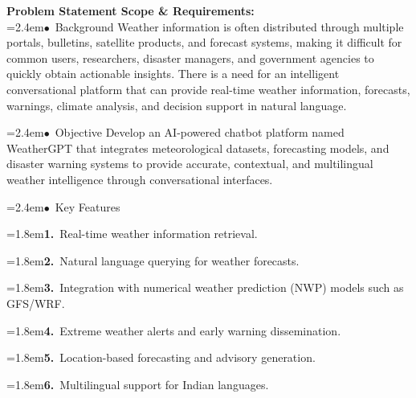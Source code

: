 \documentclass[10pt,a4paper]{article}
\begin{document}
\begin{tcolorbox}[pscard, title={"\textbf{SIH26068} \quad $\vert$ \quad WeatherGPT: Conversational AI for Weather Forecasting, Alerts, and Climate ...}]
\textbf{\color{sihnavy}Problem Statement Scope \& Requirements:}\\[0.15cm]
\noindent\hspace*{1.2em}\hangindent=2.4em\textcolor{sihblue}{$\bullet$}~\small Background Weather information is often distributed through multiple portals, bulletins, satellite products, and forecast systems, making it difficult for common users, researchers, disaster managers, and government agencies to quickly obtain actionable insights. There is a need for an intelligent conversational platform that can provide real-time weather information, forecasts, warnings, climate analysis, and decision support in natural language.\par\vspace{0.05cm}
\noindent\hspace*{1.2em}\hangindent=2.4em\textcolor{sihblue}{$\bullet$}~\small Objective Develop an AI-powered chatbot platform named WeatherGPT that integrates meteorological datasets, forecasting models, and disaster warning systems to provide accurate, contextual, and multilingual weather intelligence through conversational interfaces.\par\vspace{0.05cm}
\noindent\hspace*{1.2em}\hangindent=2.4em\textcolor{sihblue}{$\bullet$}~\small Key Features\par\vspace{0.05cm}
\noindent\hangindent=1.8em\textbf{1.}~\small Real-time weather information retrieval.\par\vspace{0.06cm}
\noindent\hangindent=1.8em\textbf{2.}~\small Natural language querying for weather forecasts.\par\vspace{0.06cm}
\noindent\hangindent=1.8em\textbf{3.}~\small Integration with numerical weather prediction (NWP) models such as GFS/WRF.\par\vspace{0.06cm}
\noindent\hangindent=1.8em\textbf{4.}~\small Extreme weather alerts and early warning dissemination.\par\vspace{0.06cm}
\noindent\hangindent=1.8em\textbf{5.}~\small Location-based forecasting and advisory generation.\par\vspace{0.06cm}
\noindent\hangindent=1.8em\textbf{6.}~\small Multilingual support for Indian languages.\par\vspace{0.06cm}

\end{tcolorbox}
\end{document}
